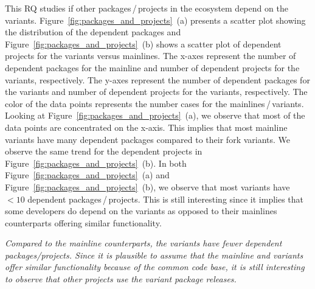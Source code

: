 This RQ studies if other packages\,/\,projects in the ecosystem depend on the variants.
Figure~\ref{fig:packages_and_projects}~(a) presents a scatter plot showing the distribution of the dependent packages and Figure~\ref{fig:packages_and_projects}~(b) shows a scatter plot of dependent projects for the variants versus mainlines.
The x-axes represent the number of dependent packages for the mainline and number of dependent projects for the variants, respectively.
The y-axes represent the number of dependent packages for the variants and number of dependent projects for the variants, respectively.
The color of the data points represents the number cases for the mainlines\,/\,variants.
Looking at Figure~\ref{fig:packages_and_projects}~(a), we observe that most of the data points are concentrated on the x-axis. 
This implies that most mainline variants have many dependent packages compared to their fork variants.
We observe the same trend for the dependent projects in Figure~\ref{fig:packages_and_projects}~(b).
In both Figure~\ref{fig:packages_and_projects}~(a) and Figure~\ref{fig:packages_and_projects}~(b), we observe that most variants have $<10$ dependent packages\,/\,projects. 
This is still interesting since it implies that some developers do depend on the variants as opposed to their mainlines counterparts offering similar functionality. 

\begin{framed}
\noindent
\emph{Compared to the mainline counterparts, the variants have fewer dependent packages/projects. Since it is plausible to assume that the mainline and variants offer similar functionality because of the common code base, it is still interesting to observe that other projects use the variant package releases.}
\end{framed}

